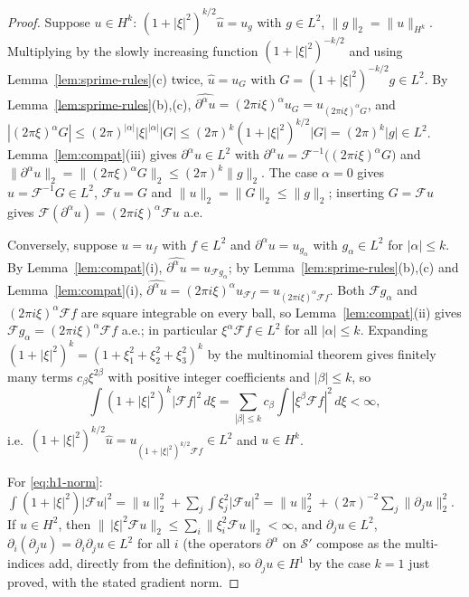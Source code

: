 \documentclass[11pt]{article}
\theoremstyle{definition}
\theoremstyle{plain}
\begin{document}
\begin{proof}
Suppose $u\in H^k$: $(1+|\xi|^2)^{k/2}\hat u=u_g$ with $g\in L^2$,
$\|g\|_2=\|u\|_{H^k}$.  Multiplying by the slowly increasing function
$(1+|\xi|^2)^{-k/2}$ and using Lemma~\ref{lem:sprime-rules}(c) twice,
$\hat u=u_G$ with $G=(1+|\xi|^2)^{-k/2}g\in L^2$.  By
Lemma~\ref{lem:sprime-rules}(b),(c),
$\widehat{\partial^\alpha u}=(2\pi i\xi)^\alpha u_G=u_{(2\pi i\xi)^\alpha G}$,
and $|(2\pi\xi)^\alpha G|\le(2\pi)^{|\alpha|}|\xi|^{|\alpha|}|G|
\le(2\pi)^k(1+|\xi|^2)^{k/2}|G|=(2\pi)^k|g|\in L^2$.
Lemma~\ref{lem:compat}(iii) gives $\partial^\alpha u\in L^2$ with
$\partial^\alpha u=\mathcal F^{-1}\bigl((2\pi i\xi)^\alpha G\bigr)$ and
$\|\partial^\alpha u\|_2=\|(2\pi\xi)^\alpha G\|_2\le(2\pi)^k\|g\|_2$.  The
case $\alpha=0$ gives $u=\mathcal F^{-1}G\in L^2$, $\mathcal Fu=G$ and
$\|u\|_2=\|G\|_2\le\|g\|_2$; inserting $G=\mathcal Fu$ gives
$\mathcal F(\partial^\alpha u)=(2\pi i\xi)^\alpha\mathcal Fu$ a.e.

Conversely, suppose $u=u_f$ with $f\in L^2$ and $\partial^\alpha u=u_{g_\alpha}$
with $g_\alpha\in L^2$ for $|\alpha|\le k$.  By Lemma~\ref{lem:compat}(i),
$\widehat{\partial^\alpha u}=u_{\mathcal Fg_\alpha}$; by
Lemma~\ref{lem:sprime-rules}(b),(c) and Lemma~\ref{lem:compat}(i),
$\widehat{\partial^\alpha u}=(2\pi i\xi)^\alpha u_{\mathcal Ff}
=u_{(2\pi i\xi)^\alpha\mathcal Ff}$.  Both $\mathcal Fg_\alpha$ and
$(2\pi i\xi)^\alpha\mathcal Ff$ are square integrable on every ball, so
Lemma~\ref{lem:compat}(ii) gives $\mathcal Fg_\alpha=(2\pi i\xi)^\alpha\mathcal Ff$
a.e.; in particular $\xi^\alpha\mathcal Ff\in L^2$ for all $|\alpha|\le k$.
Expanding $(1+|\xi|^2)^k=(1+\xi_1^2+\xi_2^2+\xi_3^2)^k$ by the multinomial
theorem gives finitely many terms $c_\beta\xi^{2\beta}$ with positive
integer coefficients and $|\beta|\le k$, so
\[
 \int(1+|\xi|^2)^k|\mathcal Ff|^2\,d\xi
 =\sum_{|\beta|\le k}c_\beta\int|\xi^\beta\mathcal Ff|^2\,d\xi<\infty ,
\]
i.e.\ $(1+|\xi|^2)^{k/2}\hat u=u_{(1+|\xi|^2)^{k/2}\mathcal Ff}\in L^2$ and
$u\in H^k$.

For \eqref{eq:h1-norm}: $\int(1+|\xi|^2)|\mathcal Fu|^2=\|u\|_2^2
+\sum_j\int\xi_j^2|\mathcal Fu|^2=\|u\|_2^2+(2\pi)^{-2}\sum_j\|\partial_ju\|_2^2$.
If $u\in H^2$, then $\|\,|\xi|^2\mathcal Fu\|_2\le\sum_i\|\xi_i^2\mathcal Fu\|_2<\infty$,
and $\partial_ju\in L^2$, $\partial_i(\partial_ju)=\partial_i\partial_ju\in L^2$
for all $i$ (the operators $\partial^\alpha$ on $\mathcal S'$ compose as the
multi-indices add, directly from the definition), so $\partial_ju\in H^1$
by the case $k=1$ just proved, with the stated gradient norm.
\end{proof}
\end{document}
